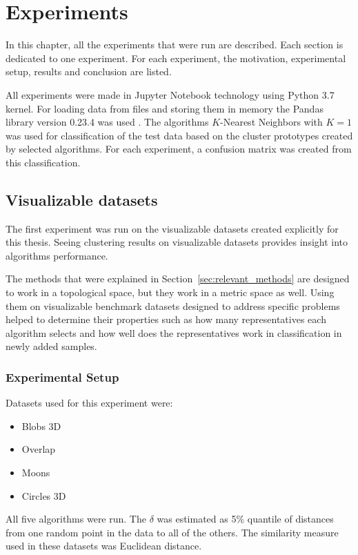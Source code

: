 \documentclass[thesis=B,english]{FITthesis}[2012/10/20]
\begin{document}
\chapter{Experiments}\label{ch:experiments}

In this chapter, all the experiments that were run are described.
Each section is dedicated to one experiment.
For each experiment, the motivation, experimental setup, results and conclusion are listed.

All experiments were made in Jupyter Notebook technology using Python 3.7 kernel.
For loading data from files and storing them in memory the Pandas library version 0.23.4 was used \cite{mckinney2010data}.
The algorithms $K$-Nearest Neighbors with $K=1$ was used for classification of the test data based on the cluster prototypes created by selected algorithms.
For each experiment, a confusion matrix was created from this classification.

\section{Visualizable datasets}\label{sec:exp1}

The first experiment was run on the visualizable datasets created explicitly for this thesis.
Seeing clustering results on visualizable datasets provides insight into algorithms performance.

The methods that were explained in Section~\ref{sec:relevant_methods} are designed to work in a topological space, but they work in a metric space as well.
Using them on visualizable benchmark datasets designed to address specific problems helped to determine their properties such as how many representatives each algorithm selects and how well does the representatives work in classification in newly added samples.

\subsection{Experimental Setup}
Datasets used for this experiment were:
\begin{itemize}
    \item Blobs 3D
    \item Overlap
    \item Moons
    \item Circles 3D
\end{itemize}

All five algorithms were run.
The $\delta$ was estimated as 5\% quantile of distances from one random point in the data to all of the others.
The similarity measure used in these datasets was Euclidean distance.
\end{document}
